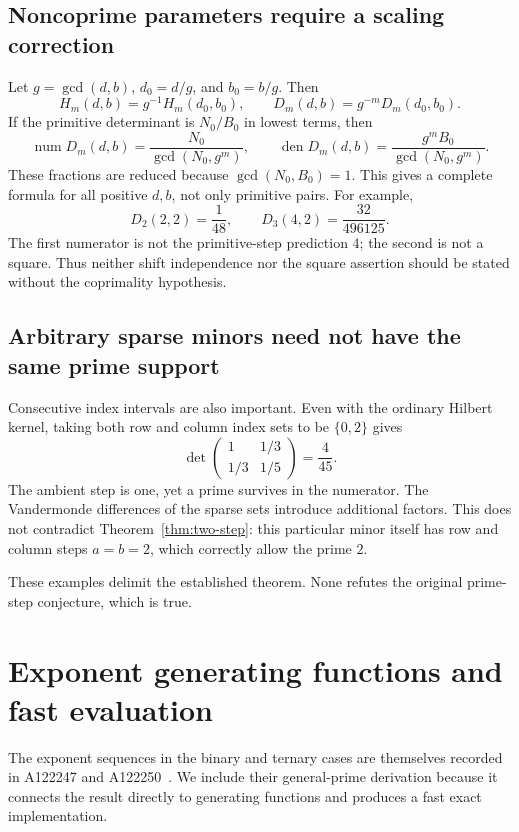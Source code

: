 \documentclass[11pt,a4paper]{article}
\theoremstyle{definition}
\theoremstyle{remark}
\newcommand{\num}{\operatorname{num}}
\newcommand{\den}{\operatorname{den}}
\begin{document}
\subsection{Noncoprime parameters require a scaling correction}
Let $g=\gcd(d,b)$, $d_0=d/g$, and $b_0=b/g$. Then
\[
 H_m(d,b)=g^{-1}H_m(d_0,b_0),\qquad
 D_m(d,b)=g^{-m}D_m(d_0,b_0).
\]
If the primitive determinant is $N_0/B_0$ in lowest terms, then
\begin{equation}
 \num D_m(d,b)=\frac{N_0}{\gcd(N_0,g^m)},\qquad
 \den D_m(d,b)=\frac{g^m B_0}{\gcd(N_0,g^m)}.
 \label{eq:nonprimitive}
\end{equation}
These fractions are reduced because $\gcd(N_0,B_0)=1$.
This gives a complete formula for all positive $d,b$, not only primitive
pairs. For example,
\[
 D_2(2,2)=\frac1{48},\qquad
 D_3(4,2)=\frac{32}{496125}.
\]
The first numerator is not the primitive-step prediction $4$; the second
is not a square. Thus neither shift independence nor the square assertion
should be stated without the coprimality hypothesis.

\subsection{Arbitrary sparse minors need not have the same prime support}
Consecutive index intervals are also important. Even with the ordinary
Hilbert kernel, taking both row and column index sets to be $\{0,2\}$ gives
\[
 \det\begin{pmatrix}1&1/3\\1/3&1/5\end{pmatrix}=\frac4{45}.
\]
The ambient step is one, yet a prime survives in the numerator. The
Vandermonde differences of the sparse sets introduce additional factors.
This does not contradict Theorem~\ref{thm:two-step}: this particular minor
itself has row and column steps $a=b=2$, which correctly allow the prime $2$.

These examples delimit the established theorem. None refutes the original
prime-step conjecture, which is true.

\section{Exponent generating functions and fast evaluation}
\label{sec:algorithms}

The exponent sequences in the binary and ternary cases are themselves
recorded in A122247 and A122250~\cite{oeis247,oeis250}. We include their
general-prime derivation because it connects the result directly to
generating functions and produces a fast exact implementation.
\end{document}
